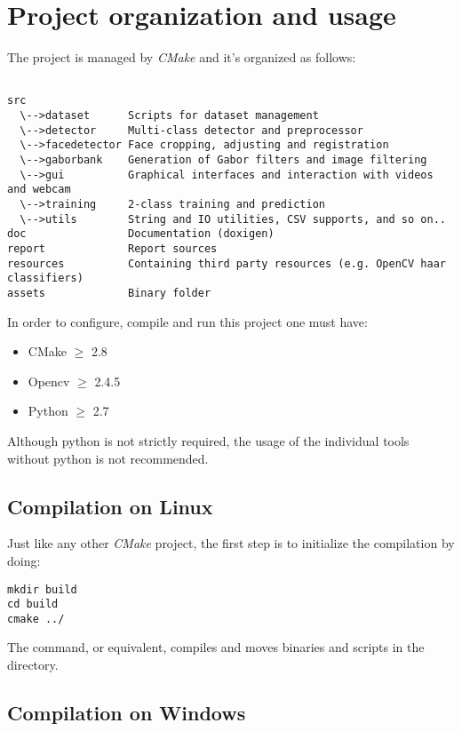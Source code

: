 \section{Project organization and usage}

The project is managed by \emph{CMake} and it's organized as follows:

\begin{verbatim}

src
  \-->dataset      Scripts for dataset management
  \-->detector     Multi-class detector and preprocessor
  \-->facedetector Face cropping, adjusting and registration
  \-->gaborbank    Generation of Gabor filters and image filtering
  \-->gui          Graphical interfaces and interaction with videos and webcam
  \-->training     2-class training and prediction
  \-->utils        String and IO utilities, CSV supports, and so on..
doc                Documentation (doxigen)
report             Report sources
resources          Containing third party resources (e.g. OpenCV haar classifiers)
assets             Binary folder

\end{verbatim}

In order to configure, compile and run this project one must have:

\begin{itemize}
  \item CMake $\ge$ 2.8
  \item Opencv $\ge$ 2.4.5
  \item Python $\ge$ 2.7
\end{itemize}

Although python is not strictly required, the usage of the individual tools
without python is not recommended.

\subsection{Compilation on Linux}

Just like any other \emph{CMake} project, the first step is to initialize the
compilation by doing:

\begin{verbatim}
mkdir build
cd build
cmake ../
\end{verbatim}

The  command, or equivalent, compiles and moves binaries and
scripts in the  directory.

\subsection{Compilation on Windows}

